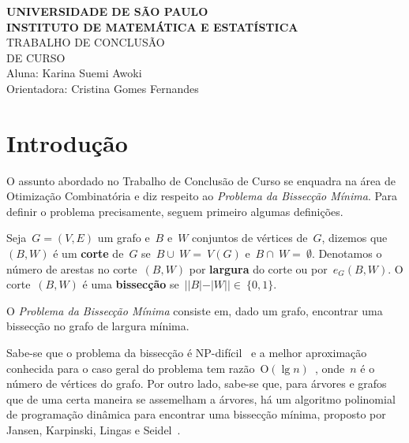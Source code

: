 \documentclass[a4paper,12pt]{article}
\newcommand{\Oh}{\mathrm{O}}
\begin{document}
 
\begin{center}
   {\large \textbf{UNIVERSIDADE DE SÃO PAULO}} \\[1.4cm]
   
   {\large \textbf{INSTITUTO DE MATEMÁTICA E ESTATÍSTICA}}\\[4.2cm]
   
   {\Huge TRABALHO DE CONCLUSÃO }\\[0.3cm]
   {\Huge DE CURSO }\\[9cm]
   
   {\large { Aluna: Karina Suemi Awoki}}\\[0.3cm]
   
   {\large { Orientadora: Cristina Gomes Fernandes}}
   

\end{center}

\newpage
\tableofcontents

\newpage


\section{Introdução}

O assunto abordado no Trabalho de Conclusão de Curso se
enquadra na área de Otimização Combinatória e diz respeito ao 
\emph{Problema da Bissecção Mínima}. Para definir o problema 
precisamente, seguem primeiro algumas definições. 

Seja~$G=(V,E)$ um grafo e~$B$ e~$W$ conjuntos de vértices de~$G$,
dizemos que~$(B,W)$ é um \textbf{corte}
de~$G$ se~$B \cup~W =~V(G)$ e~$B\cap~W =~\emptyset$.
Denotamos o número de arestas no corte~$(B,W)$ por \textbf{largura} do corte ou por~$e_G(B,W)$.
O corte~$(B,W)$ é uma \textbf{bissecção} se~$||B|-|W||\in~\{0, 1\}$.

O \emph{Problema da Bissecção Mínima} consiste em, dado um grafo, 
encontrar uma bissecção no grafo de largura mínima.

Sabe-se que o problema da bissecção é NP-difícil~\cite{GareyJS76} 
e a melhor aproximação conhecida para o caso geral do problema tem 
razão~$\Oh(\lg n)$~\cite{Racke08}, onde~$n$ é o número de vértices 
do grafo. 
Por outro lado, sabe-se que, para árvores e grafos que de uma 
certa maneira se assemelham a árvores, há um algoritmo polinomial 
de programação dinâmica para encontrar uma bissecção mínima, 
proposto por Jansen, Karpinski, Lingas e 
Seidel~\cite{JansenKLS01}. 
\end{document}
